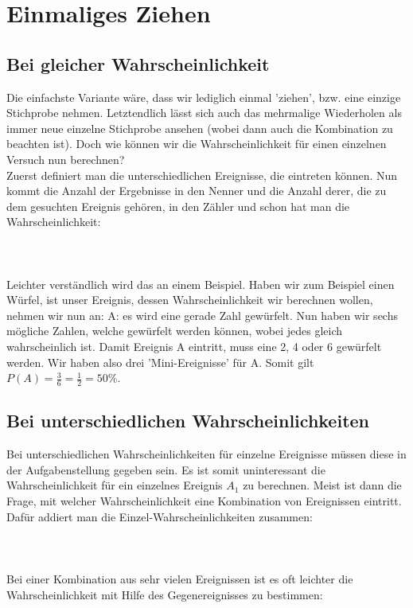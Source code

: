 \section{Einmaliges Ziehen}
	\subsection{Bei gleicher Wahrscheinlichkeit}
		Die einfachste Variante wäre, dass wir lediglich einmal 'ziehen', bzw. eine
		einzige Stichprobe nehmen. Letztendlich lässt sich auch das mehrmalige
		Wiederholen als immer neue einzelne Stichprobe ansehen (wobei dann auch die
		Kombination zu beachten ist). Doch wie können wir die Wahrscheinlichkeit für
		einen einzelnen Versuch nun berechnen?\\
		Zuerst definiert man die unterschiedlichen Ereignisse, die eintreten können.
		Nun kommt die Anzahl der Ergebnisse in den Nenner und die Anzahl derer, die zu
		dem gesuchten Ereignis gehören, in den Zähler und schon hat man die
		Wahrscheinlichkeit:
		\\ \\
		\formel{\[P(A)=\frac{Anzahl\ der\ Ereignisse\ von\ A}{Anzahl\ der\ gesamten\
		Ereignisse}=\frac{\#A}{\#\Omega}\]}
		\\ \\
		Leichter verständlich wird das an einem	Beispiel. Haben wir zum Beispiel einen
		Würfel, ist unser Ereignis, dessen Wahrscheinlichkeit wir berechnen wollen,
		nehmen wir nun an: A: es wird eine gerade Zahl gewürfelt. Nun haben wir sechs
		mögliche Zahlen, welche gewürfelt werden können, wobei jedes gleich
		wahrscheinlich ist. Damit Ereignis A eintritt, muss eine 2, 4 oder 6 gewürfelt
		werden. Wir haben also drei 'Mini-Ereignisse' für A. Somit gilt
		\(P(A)=\frac{3}{6}=\frac{1}{2}=50\%\).
	
	\subsection{Bei unterschiedlichen Wahrscheinlichkeiten}
		Bei unterschiedlichen Wahrscheinlichkeiten für einzelne Ereignisse müssen
		diese in der Aufgabenstellung gegeben sein. Es ist somit uninteressant die
		Wahrscheinlichkeit für ein einzelnes Ereignis \(A_1\) zu berechnen. Meist ist
		dann die Frage, mit welcher Wahrscheinlichkeit eine Kombination von
		Ereignissen eintritt. Dafür addiert man die Einzel-Wahrscheinlichkeiten zusammen:
		\\ \\
		\formel{\[P(A)=P(A_1)+P(A_2)+\cdots+P(A_n)\]}
		\\ \\
		Bei einer Kombination aus sehr vielen Ereignissen ist es oft leichter die
		Wahrscheinlichkeit mit Hilfe des Gegenereignisses zu bestimmen:
		\\ \\
		\formel{\[P(A)=1-P(\bar{A})=1-(P(\bar{A}_1)+P(\bar{A}_2)+\cdots+P(\bar{A}_n))\]}
